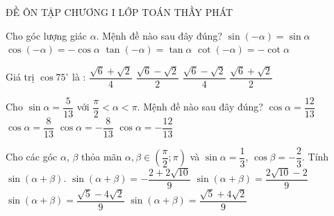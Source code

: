 \setcounter{deso}{0}
\begin{name}
	{\tenchude}
	{ĐỀ ÔN TẬP CHƯƠNG I}
	{LỚP TOÁN THẦY PHÁT}
	{\thoigian}
\end{name}
\TN
\begin{ex}
	Cho góc lượng giác $\alpha $. Mệnh đề nào sau đây đúng?
	\choice
	{$\sin \left(-\alpha\right)=\sin \alpha $}
	{$\cos \left(-\alpha\right)=-\cos \alpha $}
	{$\tan \left(-\alpha\right)=\tan \alpha $}
	{\True $\cot \left(-\alpha\right)=-\cot \alpha $}
\end{ex}
\begin{ex}
	Giá trị $\cos 75^\circ $ là :
	\choice
	{$\dfrac{\sqrt{6}+\sqrt{2}}{4}$}
	{$\dfrac{\sqrt{6}-\sqrt{2}}{2}$}
	{\True $\dfrac{\sqrt{6}-\sqrt{2}}{4}$}
	{$\dfrac{\sqrt{6}+\sqrt{2}}{2}$}
\end{ex}
\begin{ex}
	Cho $\sin \alpha =\dfrac{5}{13}$ với $\dfrac{\pi }{2}<\alpha <\pi $. Mệnh đề nào sau đây đúng?
	\choice
	{$\cos \alpha =\dfrac{12}{13}$}
	{$\cos \alpha =\dfrac{8}{13}$}
	{$\cos \alpha =-\dfrac{8}{13}$}
	{\True $\cos \alpha =-\dfrac{12}{13}$}
\end{ex}
\begin{ex}
	Cho các góc $\alpha $, $\beta $ thỏa mãn $\alpha ,\beta \in \left(\dfrac{\pi }{2};\pi\right)$ và $\sin \alpha =\dfrac{1}{3}$, $\cos \beta =-\dfrac{2}{3}$. Tính $\sin \left(\alpha +\beta\right)$.
	\choice
	{\True $\sin \left(\alpha +\beta\right)=-\dfrac{2+2\sqrt{10}}{9}$}
	{$\sin \left(\alpha +\beta\right)=\dfrac{2\sqrt{10}-2}{9}$}
	{$\sin \left(\alpha +\beta\right)=\dfrac{\sqrt{5}-4\sqrt{2}}{9}$}
	{$\sin \left(\alpha +\beta\right)=\dfrac{\sqrt{5}+4\sqrt{2}}{9}$}
\end{ex}
